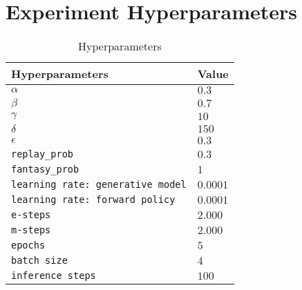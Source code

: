 \clearpage
\section{Experiment Hyperparameters}\label{app:hyperparams}
\begin{table}[H]
    \centering
    \begin{tabular}{|l|l|}
        \hline
        \textbf{Hyperparameters} & \textbf{Value} \\\hline
        $\alpha$ & $0.3$ \\\hline
        $\beta$ & $0.7$ \\\hline
        $\gamma$ & $10$ \\\hline
        $\delta$ & $150$ \\\hline 
        $\epsilon$ & $0.3$ \\\hline 
        \texttt{replay\_prob} & $0.3$ \\\hline 
        \texttt{fantasy\_prob} & $1$ \\\hline 
        \texttt{learning rate: generative model} & $0.0001$ \\\hline 
        \texttt{learning rate: forward policy} & $0.0001$ \\\hline 
        \texttt{e-steps} & $2.000$ \\\hline 
        \texttt{m-steps} & $2.000$ \\\hline 
        \texttt{epochs} & $5$ \\\hline 
        \texttt{batch size} & $4$ \\\hline 
        \texttt{inference steps} & $100$ \\\hline 
    \end{tabular}
    \caption{Hyperparameters}
    \label{tab:hyperparams}
\end{table}

\clearpage
